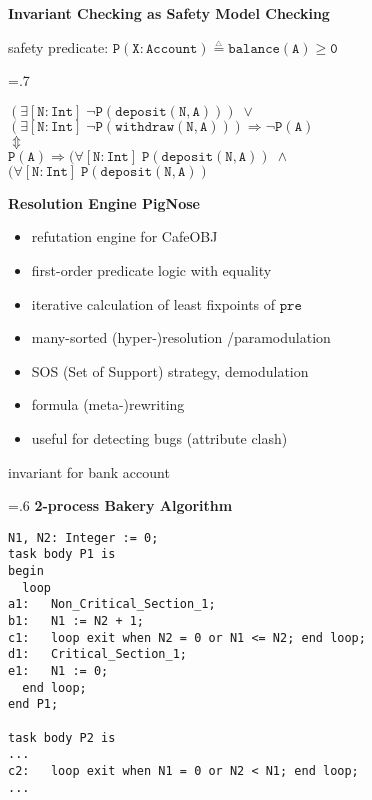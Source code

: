 \documentclass[landscape]{slides}
\def\DEF{\mathrel{\stackrel{_\triangle}{=}}}
\begin{document}
\begin{slide}\large\parskip=0pt
\textbf{Invariant Checking as Safety Model Checking}

\bigskip

safety predicate: $\mathtt{P(X:Account)\DEF balance(A)\geq 0}$

\bigskip\bigskip

\hfil\epsfxsize=.7\textwidth{}\hfil
\normalsize
\begin{center}
$\mathtt{(\exists[N:Int]\;\neg P(deposit(N,A)))\;\vee}$\\
$\mathtt{(\exists[N:Int]\;\neg P(withdraw(N,A)))\Rightarrow \neg P(A)}$\\
$\Updownarrow$\\
$\mathtt{P(A)\Rightarrow (\forall[N:Int]\;P(deposit(N,A))\;\wedge}$\\
$\mathtt{(\forall[N:Int]\;P(deposit(N,A))}$\\
\end{center}


\end{slide}


\begin{slide}\large\parskip=0pt
\textbf{Resolution Engine PigNose}
\begin{itemize}
\item refutation engine for CafeOBJ
\item first-order predicate logic with equality
\item iterative calculation of least fixpoints of $\mathtt{pre}$
\item many-sorted (hyper-)resolution \slash paramodulation
\item SOS (Set of Support) strategy, demodulation
\item formula (meta-)rewriting
\item useful for detecting bugs (attribute clash)
\end{itemize}
\end{slide}

\begin{slide}\large\parskip=0pt
  \vfil
  \begin{center}

    \bigskip

    invariant for bank account
  \end{center}
  \vfil
\end{slide}

\begin{slide}\large\parskip=0pt\baselineskip=.6\baselineskip
\textbf{2-process Bakery Algorithm}

\bigskip\bigskip

\begin{verbatim}
N1, N2: Integer := 0;
task body P1 is
begin
  loop
a1:   Non_Critical_Section_1;
b1:   N1 := N2 + 1;
c1:   loop exit when N2 = 0 or N1 <= N2; end loop;
d1:   Critical_Section_1;
e1:   N1 := 0;
  end loop;
end P1;

task body P2 is
...
c2:   loop exit when N1 = 0 or N2 < N1; end loop;
...
\end{verbatim}
\end{slide}
\end{document}
